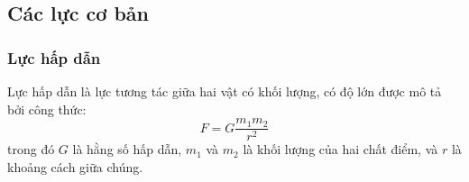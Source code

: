 \subsection{Các lực cơ bản}

\begin{frame}
    \frametitle{Lực hấp dẫn}
    \begin{tcolorbox}[colback=blue!10, colframe=blue!50!black, title=Định luật vạn vật hấp dẫn]
    Lực hấp dẫn là lực tương tác giữa hai vật có khối lượng, có độ lớn được mô tả bởi công thức:
    \begin{equation}
        F = G \frac{m_1 m_2}{r^2}
    \end{equation}
    trong đó \(G\) là hằng số hấp dẫn, \(m_1\) và \(m_2\) là khối lượng của hai chất điểm, và \(r\) là khoảng cách giữa chúng.
    \end{tcolorbox}
\end{frame}

